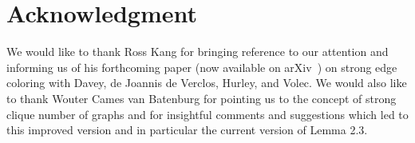 \documentclass[11pt]{amsart}
\begin{document}
\section{Acknowledgment} We would like to thank Ross Kang for bringing reference \cite{davey2024local} to our attention and informing us of his forthcoming paper  (now available on arXiv~\cite{davey2026}) on strong edge coloring with Davey, de Joannis de Verclos, Hurley, and Volec. We would also like to thank Wouter Cames van Batenburg for pointing us to the concept of strong clique number of graphs and for insightful comments and suggestions which led to this improved version and in particular the current version of Lemma 2.3.

\newpage
 

\end{document}
